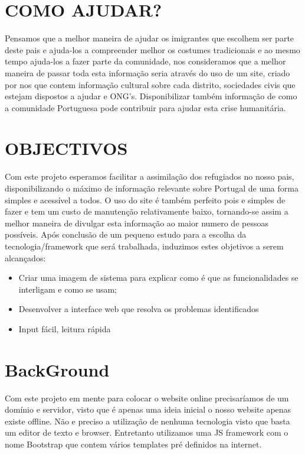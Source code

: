 \documentclass{article}
\begin{document}
\section{COMO AJUDAR?}
Pensamos que a melhor maneira de ajudar os imigrantes
que escolhem ser parte deste pais e ajuda-los a compreender
melhor os costumes tradicionais e ao mesmo tempo ajuda-los
a fazer parte da comunidade, nos consideramos que a melhor
maneira de passar toda esta informação seria através do uso
de um site, criado por nos que contem informação cultural
sobre cada distrito, sociedades civis que estejam dispostos
a ajudar e ONG's. Disponibilizar também informação de
como a comunidade Portuguesa pode contribuir para ajudar
esta crise humanitária.

\section{OBJECTIVOS}
Com este projeto esperamos facilitar a assimilação dos
refugiados no nosso pais, disponibilizando o máximo de informação relevante sobre Portugal de uma forma simples e
acessível a todos. O uso do site é também perfeito pois e simples
de fazer e tem um custo de manutenção relativamente
baixo, tornando-se assim a melhor maneira de divulgar esta
informação ao maior numero de pessoas possíveis.
Após conclusão de um pequeno estudo para a escolha da tecnologia/framework que será trabalhada, induzimos estes objetivos a serem alcançados:
\begin{itemize}
\item Criar uma imagem de sistema para explicar como é que as funcionalidades se interligam e como se usam;
\item Desenvolver a interface web que resolva os problemas identificados
\item Input fácil, leitura rápida
\end{itemize}

\section{BackGround}
Com este projeto em mente para colocar o website online
precisaríamos de um domínio e servidor, visto que é apenas
uma ideia inicial o nosso website apenas existe offline.
Não e preciso a utilização de nenhuma tecnologia visto que
basta um editor de texto e browser. Entretanto utilizamos uma JS framework com o nome Bootstrap que contem vários templates 
pré definidos na internet.
\end{document}
